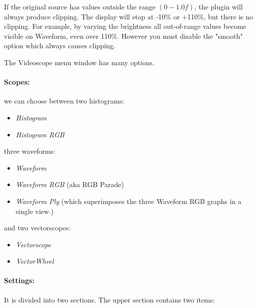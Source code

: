 If the original source has values outside the range $(0 -1.0f)$, the plugin will always produce clipping. The display will stop at -10\% or +110\%, but there is no clipping.  For example, by varying the brightness all out-of-range values become visible on Waveform, even over 110\%. However you must disable the "smooth" option which always causes clipping.

The Videoscope menu window has many options.

\paragraph*{Scopes:} we can choose between two histograms:

\begin{itemize}[noitemsep]
	\item \textit{Histogram}
	\item \textit{Histogram RGB}
\end{itemize}
three waveforms: 
\begin{itemize}[noitemsep]
	\item \textit{Waveform}
	\item \textit{Waveform RGB} (aka RGB Parade)
	\item \textit{Waveform Ply} (which superimposes the three Waveform RGB graphs in a single view.)
\end{itemize}
and two vectorscopes: 
\begin{itemize}[noitemsep]
	\item \textit{Vectorscope}
	\item \textit{VectorWheel}
\end{itemize}

\paragraph*{Settings:} It is divided into two sections. The upper section contains two items:

